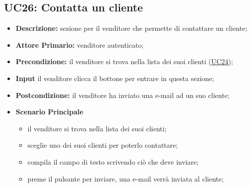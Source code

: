 \subsection{UC26: Contatta un cliente}
\label{sec:UC26}
\begin{itemize}
    \item \textbf{Descrizione:} sezione per il venditore che permette di contattare un cliente;
    \item \textbf{Attore Primario:} venditore autenticato;
    \item \textbf{Precondizione:} il venditore si trova nella lista dei suoi clienti (\hyperref[sec:UC24]{\underline{UC24}});
    \item \textbf{Input} il venditore clicca il bottone per entrare in questa sezione; 
    \item \textbf{Postcondizione:} il venditore ha inviato una e-mail ad un suo cliente;
    \item \textbf{Scenario Principale}
        \begin{itemize}
            \item il venditore si trova nella lista dei suoi clienti;
            \item sceglie uno dei suoi clienti per poterlo contattare;
            \item compila il campo di testo scrivendo ciò che deve inviare;
            \item preme il pulsante per inviare, una e-mail verrà inviata al cliente;
        \end{itemize}
\end{itemize}